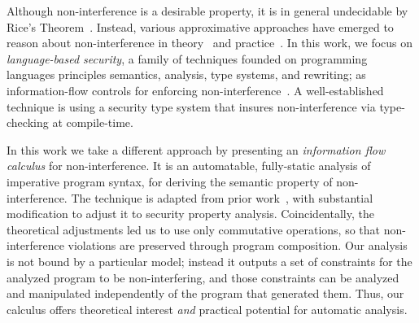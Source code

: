 \documentclass[conference]{IEEEtran}
\begin{document}
Although non-interference is a desirable property, it is in general undecidable by Rice's Theorem~\cite{rice1953}. %
Instead, various approximative approaches have emerged to reason about non-interference in theory~\cite{VolpanoI1996,abadi1999b,bowman2015} and practice~\cite{Myers1999,hammer2009,Broberg2013,arzt2014,huang2014}.
In this work, we focus on \emph{language-based security},
a family of techniques founded on programming languages principles \eg semantics, analysis, type systems, and rewriting;
as information-flow controls for enforcing non-interference~\cite{schneider2001,sabelfeld2003}.
A well-established technique %
is using a security type system that insures non-interference via type-checking at compile-time.

In this work we take a different approach by presenting an \emph{information flow calculus} for non-interference.
It is an automatable, fully-static analysis of imperative program syntax, for deriving the semantic property of non-interference.
The technique is adapted from prior work~\cite{Aubert2023a}, with substantial modification to adjust it to security property analysis.
Coincidentally, the theoretical adjustments led us to use only commutative operations, so that non-interference violations are preserved through program composition.
Our analysis is not bound by a particular model;
instead it outputs a set of constraints for the analyzed program to be non-interfering, and
those constraints can be analyzed and manipulated independently of the program that generated them.
Thus, our calculus offers %
 theoretical interest \emph{and} practical potential for automatic %
 analysis.
\end{document}
